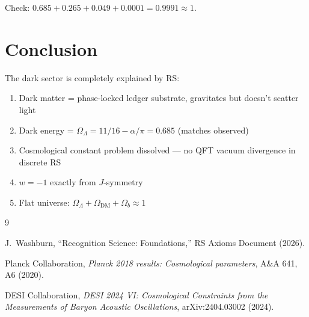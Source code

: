 \documentclass[12pt,a4paper]{article}
\theoremstyle{definition}
\theoremstyle{remark}
\begin{document}
Check: $0.685 + 0.265 + 0.049 + 0.0001 = 0.9991 \approx 1$. \checkmark

\section{Conclusion}

The dark sector is completely explained by RS:
\begin{enumerate}
\item Dark matter = phase-locked ledger substrate, gravitates but doesn't scatter light
\item Dark energy = $\Omega_\Lambda = 11/16 - \alpha/\pi = 0.685$ (matches observed)
\item Cosmological constant problem dissolved — no QFT vacuum divergence in discrete RS
\item $w = -1$ exactly from $J$-symmetry
\item Flat universe: $\Omega_\Lambda + \Omega_\mathrm{DM} + \Omega_b \approx 1$
\end{enumerate}

\begin{thebibliography}{9}

J.~Washburn, ``Recognition Science: Foundations,''
RS Axioms Document (2026).

 Planck Collaboration, \emph{Planck 2018 results: Cosmological parameters}, 
A\&A 641, A6 (2020).

 DESI Collaboration, \emph{DESI 2024 VI: Cosmological Constraints from the 
Measurements of Baryon Acoustic Oscillations}, arXiv:2404.03002 (2024).
\end{thebibliography}
\end{document}
